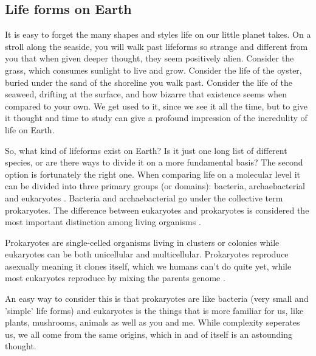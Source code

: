 \subsection*{Life forms on Earth}

It is easy to forget the many shapes and styles life on our little planet takes. On a stroll along the seaside, you will walk past lifeforms so strange and different from you that when given deeper thought, they seem positively alien.
Consider the grass, which consumes sunlight to live and grow. Consider the life of the oyster, buried under the sand of the shoreline you walk past.
Consider the life of the seaweed, drifting at the surface, and how bizarre that existence seems when compared to your own.
We get used to it, since we see it all the time, but to give it thought and time to study can give a profound impression of the incredulity of life on Earth.

So, what kind of lifeforms exist on Earth?
Is it just one long list of different species, or are there ways to divide it on a more fundamental basis?
The second option is fortunately the right one.
When comparing life on a molecular level it can be divided into three primary groups (or domains): bacteria, archaebacterial and eukaryotes \cite{Eukaryotes}.
Bacteria and archaebacterial go under the collective term prokaryotes.
The difference between eukaryotes and prokaryotes is considered the most important distinction among living organisms \cite{Procaryotes}.

Prokaryotes are single-celled organisms living in clusters or colonies while eukaryotes can be both unicellular and multicellular.
Prokaryotes reproduce asexually meaning it clones itself, which we humans can't do quite yet, while most eukaryotes reproduce by mixing the parents genome \cite{ProcaEuka}.

An easy way to consider this is that prokaryotes are like bacteria (very small and 'simple' life forms) and eukaryotes is the things that is more familiar for us, like plants, mushrooms, animals as well as you and me.
While complexity seperates us, we all come from the same origins, which in and of itself is an astounding thought.

